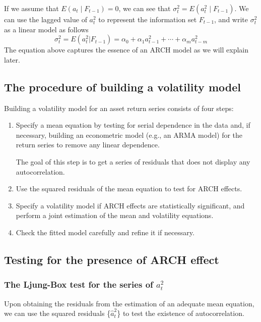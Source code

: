\documentclass[a4paper,11pt]{article}
\begin{document}
If we assume that \(E(a_t \mid F_{t-1}) = 0\), we can see that
\(\sigma^2_t = E(a^2_t \mid F_{t-1})\). We can use the lagged value of
\(a^2_t\) to represent the information set \(F_{t-1}\), and write
\(\sigma^2_t\) as a linear model as follows
\[ \sigma^2_t = E(a^2_t | F_{t-1}) = \alpha_0 + \alpha_1 a^2_{t-1} +
\cdots + \alpha_m a^2_{t-m} \]
The equation above captures the essence of an ARCH model as we will
explain later.

\subsection{The procedure of building a volatility model}
\label{sec:org33a762a}

Building a volatility model for an asset return series consists of
four steps:

\begin{enumerate}
\item Specify a mean equation by testing for serial dependence in the
data and, if necessary, building an econometric model (e.g., an
ARMA model) for the return series to remove any linear dependence.

The goal of this step is to get a series of residuals that does not
display any autocorrelation.

\item Use the squared residuals of the mean equation to test for ARCH
effects.

\item Specify a volatility model if ARCH effects are statistically
significant, and perform a joint estimation of the mean and
volatility equations.

\item Check the fitted model carefully and refine it if necessary.
\end{enumerate}


\subsection{Testing for the presence of ARCH effect}
\label{sec:org20eccf8}

\subsubsection*{The Ljung-Box test for the series of \(a^2_t\)}
\label{sec:org88a836a}

Upon obtaining the residuals from the estimation
of an adequate mean equation, we can use the squared residuals
\{\(\hat{a}_t^2\)\} to test the existence of autocorrelation.
\end{document}
